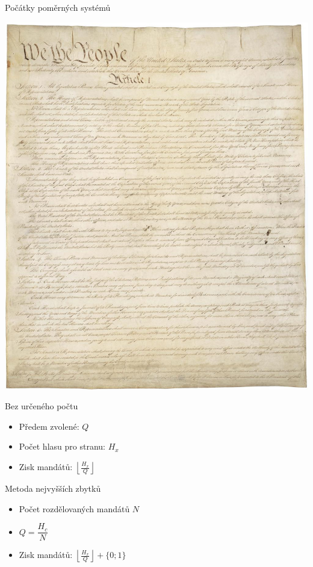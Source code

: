 \documentclass[17pt]{beamer}
\begin{document}
\begin{frame}{Počátky poměrných systémů}
\begin{center}
\includegraphics[scale=0.2]{zdroje/const.jpg}
\end{center}
\end{frame}

\begin{frame}{Bez určeného počtu}
\begin{itemize}
\item Předem zvolené: $Q$
\item Počet hlasu pro stranu: $H_{x}$
\item Zisk mandátů: $\left\lfloor\frac{H_{x}}{Q}\right\rfloor$
\end{itemize}
\end{frame}

\begin{frame}{Metoda nejvyšších zbytků}
\begin{itemize}
\item Počet rozdělovaných mandátů $N$
\item $Q=\dfrac{H_{c}}{N}$
\item Zisk mandátů: $\left\lfloor\frac{H_{x}}{Q}\right\rfloor+\{0;1\}$
\end{itemize}
\end{frame}
\end{document}
